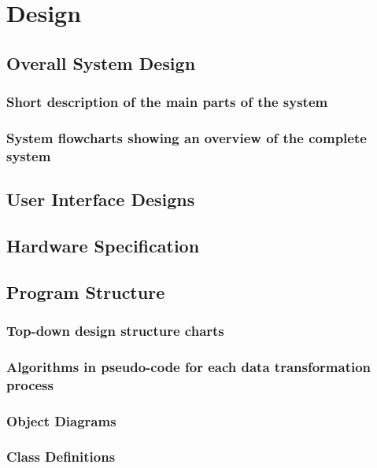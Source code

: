  \chapter{Design}

\section{Overall System Design}

\subsection{Short description of the main parts of the system}

\subsection{System flowcharts showing an overview of the complete system}

\section{User Interface Designs}

\section{Hardware Specification}

\section{Program Structure}

\subsection{Top-down design structure charts}

\subsection{Algorithms in pseudo-code for each data transformation process}

\subsection{Object Diagrams}

\subsection{Class Definitions}

